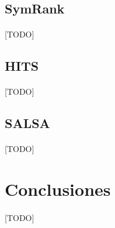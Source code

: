 \documentclass{subfiles}
\begin{document}
      \subsection{SymRank}
      \label{sec:symrank}

        \paragraph{}
        [TODO]

      \subsection{HITS}
      \label{sec:hits}

        \paragraph{}
        [TODO]

      \subsection{SALSA}
      \label{sec:salsa}

        \paragraph{}
        [TODO]

    \section{Conclusiones}
    \label{sec:pagerank_conclusions}

      \paragraph{}
      [TODO]
\end{document}
